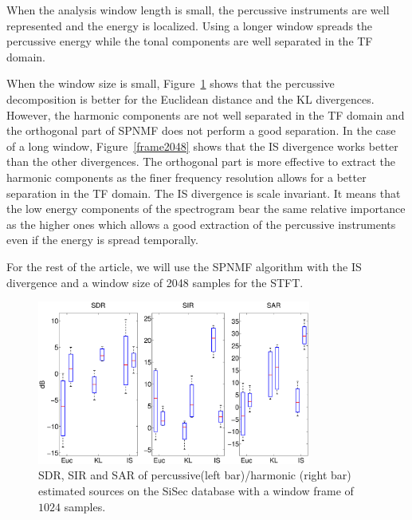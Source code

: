When the analysis window length is small, the percussive instruments are well represented and the energy is localized. Using a longer window spreads the percussive energy while the tonal components are well separated in the TF domain.

When the window size is small, Figure~\ref{frame1024} shows that the percussive decomposition is better for the Euclidean distance and the KL divergences. However, the harmonic components are not well separated in the TF domain and the orthogonal part of SPNMF does not perform a good separation.  
In the case of a long window, Figure~\ref{frame2048} shows that the IS divergence works better than the other divergences. The orthogonal part is more effective to extract the harmonic components as the finer frequency resolution allows for a better separation in the TF domain. The IS divergence is scale invariant. It means that the low energy components of the spectrogram bear the same relative importance as the higher ones which allows a good extraction of the percussive instruments even if the energy is spread temporally.


For the rest of the article, we will use the SPNMF algorithm with the IS divergence and a window size of 2048 samples for the STFT.


\begin{figure}[t]

  \centering 
  \includegraphics[width=9cm]{fig/NewDictDivTest1024}
  \caption{\label{frame1024} SDR, SIR and SAR of percussive(left bar)/harmonic (right bar) estimated sources on the SiSec database with a window frame of $1024$ samples.}
  
\end{figure}


